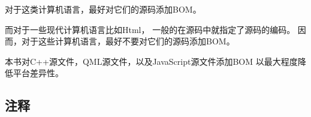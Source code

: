 对于这类计算机语言，最好对它们的源码添加BOM。

而对于一些现代计算机语言比如Html，
一般的在源码中就指定了源码的编码。
因而，对于这些计算机语言，最好不要对它们的源码添加BOM。

本书对C{\sourcefonttwo{}+}{\sourcefonttwo{}+}源文件，QML源文件，以及JavaScript源文件添加BOM
以最大程度降低平台差异性。

\FloatBarrier
\subsection{
注释
}\label{c000011s000000s02}



































